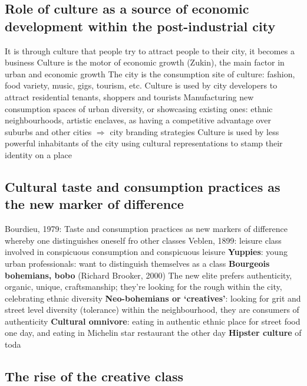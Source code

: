 \documentclass{article}
\begin{document}
\subsection{Role of culture as a source of economic development within the post-industrial city}

\begin{outline}
	\1  It is through culture that people try to attract people to their city, it becomes a business
		\2 Culture is the motor of economic growth (Zukin), the main factor in urban and economic growth
		\2 The city is the consumption site of culture: fashion, food variety, music, gigs, tourism, etc. 
	\1 Culture is used by city developers to attract residential tenants, shoppers and tourists
		\2 Manufacturing new consumption spaces of urban diversity, or showcasing existing ones: ethnic neighbourhoods, artistic enclaves, as having a competitive advantage over suburbs and other cities $\Rightarrow$ city branding strategies
	\1 Culture is used by less powerful inhabitants of the city using cultural representations to stamp their identity on a place
\end{outline}

\subsection{Cultural taste and consumption practices as the new marker of difference}

\begin{outline}
	\1 Bourdieu, 1979: Taste and consumption practices as new markers of difference whereby one distinguishes oneself fro other classes
	\1 Veblen, 1899: leisure class involved in conspicuous consumption and conspicuous leisure
	\1 \textbf{Yuppies}: young urban professionals: want to distinguish themselves as a class
	\1 \textbf{Bourgeois bohemians, bobo} (Richard Brooker, 2000)
		\2 The new elite prefers authenticity, organic, unique, craftsmanship; they're looking for the rough within the city, celebrating ethnic diversity
	\1 \textbf{Neo-bohemians or `creatives'}: looking for grit and street level diversity (tolerance) within the neighbourhood, they are consumers of authenticity
	\1 \textbf{Cultural omnivore}: eating in authentic ethnic place for street food one day, and eating in Michelin star restaurant the other day
	\1 \textbf{Hipster culture} of toda
\end{outline}

\subsection{The rise of the creative class}
\end{document}
